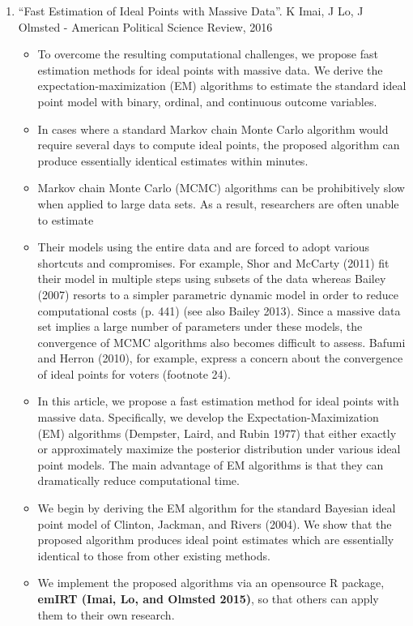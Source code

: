 \documentclass[a4paper,12pt]{article}
\begin{document}
\begin{enumerate}
\item “Fast Estimation of Ideal Points with Massive Data”. K Imai, J Lo, J Olmsted - American Political Science Review, 2016    
\begin{itemize}
\item To overcome the resulting computational challenges, we propose fast estimation methods for ideal points with massive data. We derive the expectation-maximization (EM) algorithms to estimate the standard ideal point model with binary, ordinal, and continuous outcome variables. 
\item In cases where a standard Markov chain Monte Carlo algorithm would require several days to compute ideal points, the proposed algorithm can produce essentially identical estimates within minutes. 
\item Markov chain Monte Carlo (MCMC) algorithms can be prohibitively slow when applied to large data sets. As a result, researchers are often unable to estimate 
\item Their models using the entire data and are forced to adopt various shortcuts and compromises. For example, Shor and McCarty (2011) fit their model in multiple steps using subsets of the data whereas Bailey (2007) resorts to a simpler parametric dynamic model in order to reduce computational costs (p. 441) (see also Bailey 2013). Since a massive data set implies a large number of parameters under these models, the convergence of MCMC algorithms also becomes difficult to assess. Bafumi and Herron (2010), for example, express a concern about the convergence of ideal points for voters (footnote 24). 
\item In this article, we propose a fast estimation method for ideal points with massive data. Specifically, we develop the Expectation-Maximization (EM) algorithms (Dempster, Laird, and Rubin 1977) that either exactly or approximately maximize the posterior distribution under various ideal point models. The main advantage of EM algorithms is that they can dramatically reduce computational time. 
\item We begin by deriving the EM algorithm for the standard Bayesian ideal point model of Clinton, Jackman, and Rivers (2004). We show that the proposed algorithm produces ideal point estimates which are essentially identical to those from other existing methods. 
\item We implement the proposed algorithms via an opensource R package, \textbf{emIRT (Imai, Lo, and Olmsted 2015)}, so that others can apply them to their own research. 

\end{itemize}
\end{enumerate}
\end{document}
